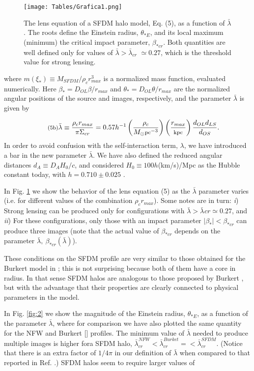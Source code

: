 \documentclass[10pt,twoside,twocolumn]{article}
\begin{document}
\begin{figure}[h] 
    \texttt{[image: Tables/Grafica1.png]}
        \caption{The lens equation of a SFDM halo model, Eq. (5), as
a function of $\bar{\lambda}$. The roots define the Einstein radius, $\theta_{*E}$, and
its local maximum (minimum) the critical impact parameter,
$\beta_{*cr}$. Both quantities are well defined only for values of $\bar{\lambda}>\bar{\lambda}_{cr}$ $\simeq 0.27$, which is the threshold value for strong lensing.}
        \label{fig:1}
\end{figure}

where $m(\xi_*)\equiv M_{SFDM}/\rho_{c}r^3_{max}$ is a normalized mass
function, evaluated numerically. Here $\beta_{*}=D_{OL}\beta/r_{max}$
and $\theta_*=D_{OL}\theta/r_{max}$ are the normalized angular positions of the source and images, respectively, and the parameter $\bar{\lambda}$ is given by

\begin{equation}
\footnotesize{
\tag{5b}\label{eq:5b}
{\bar{\lambda}}\equiv\frac{\rho_cr_{max}}{\pi\Sigma_{cr}}=0.57h^{-1}\left( \frac{\rho_c}{M_{\odot}\text{pc}^{-3}} \right)\left( \frac{r_{max}}{\text{kpc}} \right) \frac{d_{OL}d_{LS}}{d_{OS}}.
}
\end{equation}
In order to avoid confusion with the self-interaction term, $\lambda$, we have introduced a bar in the new parameter $\bar{\lambda}$. We
have also defined the reduced angular distances $d_A\equiv D_AH_0/c$, and considered $H_0\equiv 100h$(km/s)/Mpc as the
Hubble constant today, with $h=0.710\pm 0.025$ \cite{14}. \par

In Fig. \ref{fig:1} we show the behavior of the lens equation (5)
as the $\bar{\lambda}$ parameter varies (i.e. for different values of the
combination $\rho_cr_{max}$). Some notes are in turn: \textit{i}) Strong
lensing can be produced only for configurations with ${\bar{\lambda}}>{\bar{\lambda}}_{}cr\simeq0.27$, and \textit{ii}) For these configurations, only those
with an impact parameter $|\beta_*|<\beta_{*cr}$ can produce three images (note that the actual value of $\beta_{*cr}$ depends on the parameter ${\bar{\lambda}},~\beta_{*cr}({\bar{\lambda}})$).\par
These conditions on the SFDM profile are very similar to those obtained for the Burkert model in \cite{15}; this is not surprising because both of them have a core in radius. In that sense SFDM halos are analogous to those proposed by Burkert \cite{16}, but with the advantage that their properties are clearly connected to physical parameters in the model.\par
In Fig. \ref{fig:2} we show the magnitude of the Einstein radius, $\theta_{*E}$, as a function of the parameter $\bar{\lambda}$, where for comparison we have also plotted the same quantity for the NFW \cite{17} and Burkert [\cite{15}] profiles. The minimum value of $\bar{\lambda}$ needed to produce multiple images is higher fora SFDM halo, ${\bar{\lambda}}_{cr}^{NFW}<{\bar{\lambda}}_{cr}^{Burket}=<{\bar{\lambda}}_{cr}^{SFDM}$. (Notice that there is an extra factor of $1/4\pi $ in
our definition of $\bar{\lambda}$ when compared to that reported in Ref. \cite{15}.) SFDM halos seem to require larger values of
\end{document}

